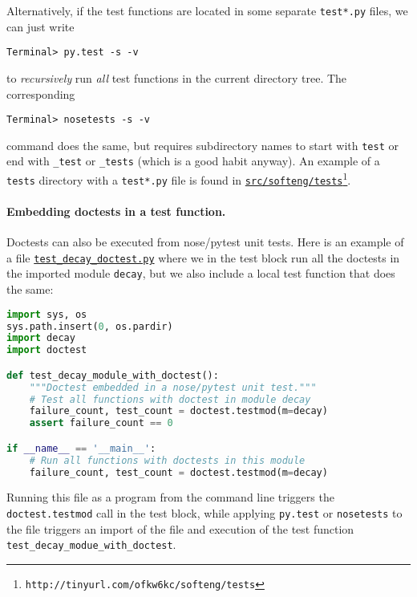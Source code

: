 \documentclass[graybox,sectrefs,envcountresetchap,open=right,final]{svmonodo}
\begin{document}
Alternatively, if the test functions are located in some separate
\texttt{test*.py} files,
we can just write

\begin{Verbatim}[frame=lines,label=\fbox{{\tiny Terminal}},framesep=2.5mm,framerule=0.7pt,fontsize=\fontsize{9pt}{9pt}]
Terminal> py.test -s -v
\end{Verbatim}
to \emph{recursively} run \emph{all} test functions in the current
directory tree. The corresponding

\begin{Verbatim}[frame=lines,label=\fbox{{\tiny Terminal}},framesep=2.5mm,framerule=0.7pt,fontsize=\fontsize{9pt}{9pt}]
Terminal> nosetests -s -v
\end{Verbatim}
command does the same, but requires subdirectory names to start
with \texttt{test} or end with \Verb!_test! or \Verb!_tests! (which is a good habit anyway).
An example of a \texttt{tests} directory with a \texttt{test*.py}
file is found in \href{{http://tinyurl.com/ofkw6kc/softeng/tests}}{\nolinkurl{src/softeng/tests}\footnote{\texttt{http://tinyurl.com/ofkw6kc/softeng/tests}}}.


\paragraph{Embedding doctests in a test function.}
Doctests can also be executed from nose/pytest unit tests. Here is an
example of a file \href{{http://tinyurl.com/ofkw6kc/softeng/tests/test_decay_doctest.py}}{\nolinkurl{test_decay_doctest.py}} where we in the test
block run all the doctests in the imported module \texttt{decay}, but we also
include a local test function that does the same:

\begin{lstlisting}[language=Python,style=blue1bar_bluegreen]
import sys, os
sys.path.insert(0, os.pardir)
import decay
import doctest

def test_decay_module_with_doctest():
    """Doctest embedded in a nose/pytest unit test."""
    # Test all functions with doctest in module decay
    failure_count, test_count = doctest.testmod(m=decay)
    assert failure_count == 0

if __name__ == '__main__':
    # Run all functions with doctests in this module
    failure_count, test_count = doctest.testmod(m=decay)
\end{lstlisting}
Running this file as a program from the command line
triggers the \texttt{doctest.testmod} call
in the test block, while applying \texttt{py.test} or \texttt{nosetests} to the file triggers
an import of the file and execution of the test function
\Verb!test_decay_modue_with_doctest!.
\end{document}
